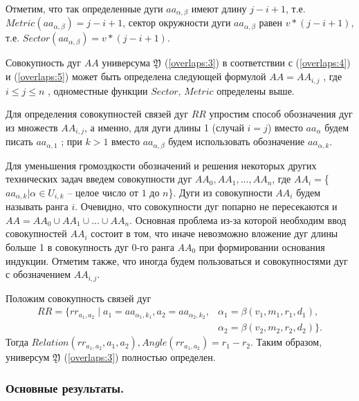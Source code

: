 Отметим, что так определенные дуги  $aa_{\alpha,\beta}$  имеют длину $j - i + 1$,  т.е. $Metric(aa_{\alpha,\beta}) =  j - i + 1$,  сектор окружности дуги  $aa_{\alpha,\beta}$  равен  $v * (j - i + 1)$, т.е. $Sector(aa_{\alpha,\beta}) =  v * (j - i + 1)$.

Совокупность дуг  $AA$  универсума  $\mathfrak{Y}$  (\ref{overlaps:3}) в соответствии с  (\ref{overlaps:4})   и  (\ref{overlaps:5})  может быть определена следующей формулой $AA  =   AA_{i,j}$ , где $i \leq j \leq n$ , одноместные  функции  $Sector$, $Metric$  определены выше.

Для определения  совокупностей связей дуг  $RR$ упростим способ обозначения дуг  из множеств   $AA_{i,j}$, а именно, для дуги длины  1  (случай  $i  = j$)  вместо $aa_\alpha$ будем писать $aa_{\alpha,1}$ ; при  $k > 1$ вместо $aa_{\alpha,\beta}$  будем использовать обозначение $aa_{\alpha, k}$.   

Для уменьшения громоздкости  обозначений и решения некоторых других технических задач введем совокупности дуг  $AA_0, AA_1,..., AA_n$, где  
$AA_i = $\{$aa_{\alpha, k} | \alpha \in U_{i,k}$ -- целое число от $1$  до  $n$\}.  Дуги из совокупности $AA_i$  будем называть ранга  $i$.  Очевидно, что совокупности дуг  попарно не пересекаются и $AA = AA_0 \cup AA_1 \cup ...\cup AA_n$. Основная проблема из-за  которой необходим ввод совокупностей  $AA_i$  состоит в том, что иначе невозможно вложение дуг длины больше  1 в совокупность дуг 0-го ранга  $AA_0$  при формировании основания индукции. Отметим также, что иногда будем пользоваться и совокупностями дуг с обозначением  $AA_{i,j}$. 

Положим   совокупность связей дуг  
\begin{equation}
\begin{split}
RR=\{rr_{a_1, a_2}\;|\;a_1 = aa_{\alpha_1,k_1} , a_2 = aa_{\alpha_2,k_2}, &\alpha_1= \beta(v_1,m_1,r_1,d_1), \\
&\alpha_2 = \beta(v_2,m_2,r_2,d_2) \}.   
\end{split}
\label{overlaps:6}     
\end{equation}
Тогда  $Relation(rr_{a_1, a_2}, a_1, a_2),  Angle(rr_{a_1, a_2}) = r_1 - r_2.$
Таким образом,  универсум  $\mathfrak{Y}$ (\ref{overlaps:3})   полностью определен. \\


\subsubsection{Основные результаты.}

